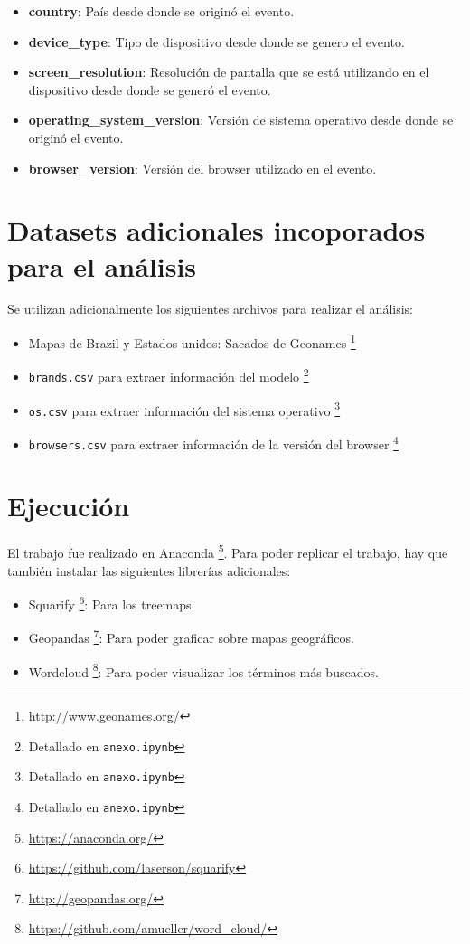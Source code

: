 \documentclass[a4paper]{article}
\begin{document}
\begin{itemize}
	\item \textbf{country}: País desde donde se originó el evento.
	\item \textbf{device\_type}: Tipo de dispositivo desde donde se genero el evento.
	\item \textbf{screen\_resolution}: Resolución de pantalla que se está utilizando en el dispositivo desde donde se generó el evento.
	\item \textbf{operating\_system\_version}: Versión de sistema operativo desde donde se originó el evento.
	\item \textbf{browser\_version}: Versión del browser utilizado en el evento.
\end{itemize}

\section{Datasets adicionales incoporados para el análisis}

Se utilizan adicionalmente los siguientes archivos para realizar el análisis:

\begin{itemize}
	\item {Mapas de Brazil y Estados unidos: Sacados de Geonames \footnote{\url{http://www.geonames.org/}} }
	\item \texttt{brands.csv} para extraer información del modelo
	\footnote{Detallado en \texttt{anexo.ipynb}}
	\item \texttt{os.csv} para extraer información del sistema operativo
	\footnote{Detallado en \texttt{anexo.ipynb}}
    \item \texttt{browsers.csv} para extraer información de la versión del browser
	\footnote{Detallado en \texttt{anexo.ipynb}}
\end{itemize}


\section{Ejecución}

El trabajo fue realizado en Anaconda \footnote{\url{https://anaconda.org/}}. Para poder replicar el trabajo, hay que también instalar las siguientes librerías adicionales:

\begin{itemize}
	\item{Squarify \footnote{\url{https://github.com/laserson/squarify}}: Para los treemaps.}
	\item{Geopandas \footnote{\url{http://geopandas.org/}}: Para poder graficar sobre mapas geográficos.}
	\item{Wordcloud \footnote{\url{https://github.com/amueller/word_cloud/}}: Para poder visualizar los términos más buscados.}
\end{itemize}
\end{document}
